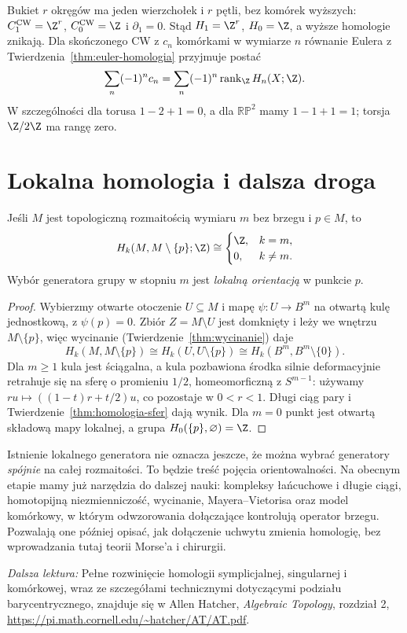 \begin{przyklad}
\label{prz:homologia-bukiet}
Bukiet $r$ okręgów ma jeden
wierzchołek i $r$ pętli,
bez komórek wyższych:
$C_1^{\mathrm{CW}}=\Z^r$,
$C_0^{\mathrm{CW}}=\Z$ i
$\partial_1=0$.
Stąd $H_1=\Z^r$, $H_0=\Z$,
a wyższe homologie znikają.
Dla skończonego CW z
$c_n$ komórkami w wymiarze $n$
równanie Eulera z
Twierdzenia~\ref{thm:euler-homologia}
przyjmuje postać
\[
 \sum_n(-1)^n c_n
 =\sum_n(-1)^n
   \operatorname{rank}_{\Z} H_n(X;\Z).
\]
W szczególności dla torusa
$1-2+1=0$, a dla
$\mathbb{RP}^2$ mamy
$1-1+1=1$; torsja
$\Z/2\Z$ ma rangę zero.
\end{przyklad}

\section{Lokalna homologia i dalsza droga}
\label{sec:lokalna-homologia}

\begin{stwierdzenie}
\label{prop:lokalna-homologia}
Jeśli $M$ jest topologiczną
rozmaitością wymiaru $m$
bez brzegu i $p\in M$, to
\[
 H_k(M,M\setminus\{p\};\Z)
 \cong
 \begin{cases}\Z,&k=m,\\0,&k\ne m.\end{cases}
\]
Wybór generatora grupy w stopniu $m$
jest \emph{lokalną orientacją}
w punkcie $p$.
\end{stwierdzenie}
\begin{proof}
Wybierzmy otwarte otoczenie $U\subseteq M$ i mapę
$\psi:U\to B^m$ na otwartą kulę jednostkową,
z $\psi(p)=0$. Zbiór
$Z=M\setminus U$
jest domknięty i leży
we wnętrzu $M\setminus\{p\}$,
więc wycinanie
(Twierdzenie~\ref{thm:wycinanie})
daje
\[
 H_k(M,M\setminus\{p\})
 \cong H_k(U,U\setminus\{p\})
\cong H_k(B^m,B^m\setminus\{0\}).
\]
Dla $m\geq1$ kula jest
ściągalna, a kula pozbawiona
środka silnie deformacyjnie retrahuje się na sferę
o promieniu $1/2$, homeomorficzną z $S^{m-1}$:
używamy $ru\mapsto((1-t)r+t/2)u$, co pozostaje w $0<r<1$.
Długi ciąg pary i
Twierdzenie~\ref{thm:homologia-sfer}
dają wynik. Dla $m=0$
punkt jest otwartą składową
mapy lokalnej, a grupa
$H_0(\{p\},\varnothing)=\Z$.
\end{proof}

Istnienie lokalnego generatora
nie oznacza jeszcze, że można
wybrać generatory \emph{spójnie}
na całej rozmaitości. To będzie
treść pojęcia orientowalności.
Na obecnym etapie mamy
już narzędzia do dalszej nauki:
kompleksy łańcuchowe i długie ciągi,
homotopijną niezmienniczość,
wycinanie, Mayera--Vietorisa
oraz model komórkowy, w którym
odwzorowania dołączające kontrolują
operator brzegu. Pozwalają one
później opisać, jak dołączenie
uchwytu zmienia homologię,
bez wprowadzania tutaj
teorii Morse'a i chirurgii.

\par\smallskip
{\footnotesize\noindent\emph{Dalsza lektura:}
Pełne rozwinięcie homologii symplicjalnej,
singularnej i komórkowej, wraz ze
szczegółami technicznymi dotyczącymi
podziału barycentrycznego, znajduje się
w Allen Hatcher,
\emph{Algebraic Topology}, rozdział 2,
\url{https://pi.math.cornell.edu/~hatcher/AT/AT.pdf}.\par}
\clearpage
